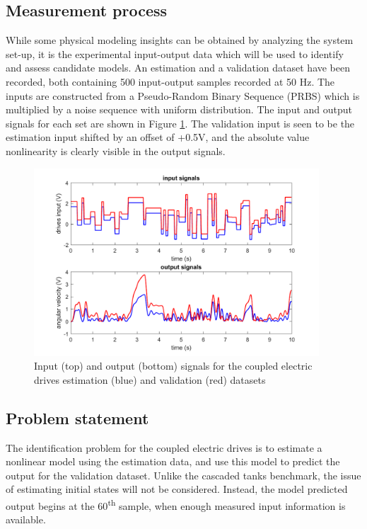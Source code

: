 \subsection{Measurement process}

While some physical modeling insights can be obtained by analyzing the system set-up, it is the experimental input-output data which will be used to identify and assess candidate models. An estimation and a validation dataset have been recorded, both containing 500 input-output samples recorded at 50 Hz. The inputs are constructed from a Pseudo-Random Binary Sequence (PRBS) which is multiplied by a noise sequence with uniform distribution. The input and output signals for each set are shown in Figure \ref{fig:EstimationData_CED}. The validation input is seen to be the estimation input shifted by an offset of +0.5V, and the absolute value nonlinearity is clearly visible in the output signals.

\begin{figure}[h]
\centering
\includegraphics[width=0.95\textwidth]{Chapter6_CaseStudies/Datasets_drives.pdf}
\caption{Input (top) and output (bottom) signals for the coupled electric drives estimation (blue) and validation (red) datasets} \label{fig:EstimationData_CED}
\end{figure}

\subsection{Problem statement}

The identification problem for the coupled electric drives is to estimate a nonlinear model using the estimation data, and use this model to predict the output for the validation dataset. Unlike the cascaded tanks benchmark, the issue of estimating initial states will not be considered. Instead, the model predicted output begins at the 60\textsuperscript{th} sample, when enough measured input information is available.


